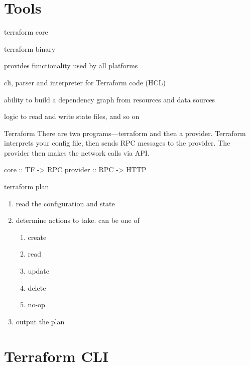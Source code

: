 \documentclass[openany, 12pt]{book}
\begin{document}
\chapter{Tools}
\begin{definition}{terraform core}{}
	\begin{alist}
		\item terraform binary
		\item provides functionality used by all platforms
		\item cli, parser and interpreter for Terraform code (HCL)
		\item ability to build a dependency graph from resources and data sources
		\item logic to read and write state files, and so on
	\end{alist}
\end{definition}

\begin{intuition}{Terraform}{}
	There are two programs---terraform and then a provider. Terraform interprets
	your config file, then sends RPC messages to the provider. The provider then
	makes the network calls via API.\@
	\begin{haskell}{}
core     :: TF -> RPC
provider :: RPC -> HTTP
	\end{haskell}
\end{intuition}

\begin{definition}{terraform plan}{}
	\begin{enumerate}[label = {(\arabic*)}]
		\item read the configuration and state
		\item determine actions to take. can be one of
		      \begin{multicols}{5}
			      \begin{enumerate}[label = {(\arabic*)}]
				      \item create
				      \item read
				      \item update
				      \item delete
				      \item no-op
			      \end{enumerate}
		      \end{multicols}
		\item output the plan
	\end{enumerate}
\end{definition}

\chapter{Terraform CLI}
\end{document}
